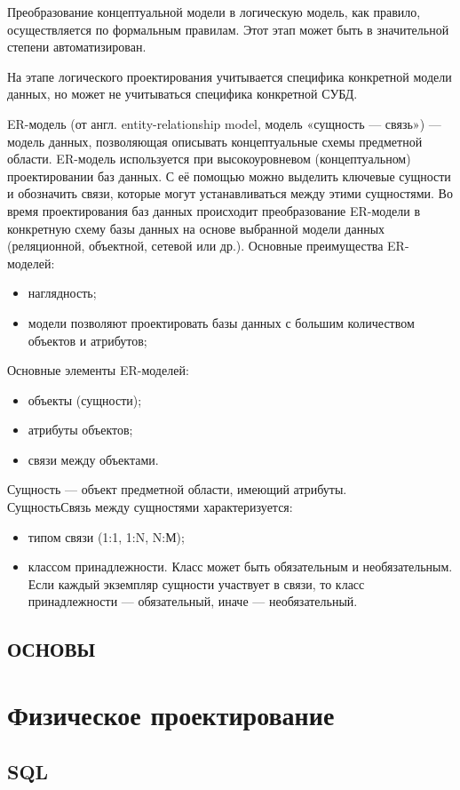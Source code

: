 \documentclass[14pt,a4paper,russian]{extreport}
\begin{document}
Преобразование концептуальной модели в логическую модель, как правило, осуществляется по
формальным правилам. Этот этап может быть в значительной степени автоматизирован.

На этапе логического проектирования учитывается специфика конкретной модели данных, но может
не учитываться специфика конкретной СУБД. 

ER-модель (от англ. entity-relationship model, модель «сущность — связь») — модель данных,
позволяющая описывать концептуальные схемы предметной области.  ER-модель используется при
высокоуровневом (концептуальном) проектировании баз данных. С её помощью можно выделить ключевые
сущности и обозначить связи, которые могут устанавливаться между этими сущностями.  Во время
проектирования баз данных происходит преобразование ER-модели в конкретную схему базы
данных на основе выбранной модели данных (реляционной, объектной, сетевой или др.).\cite{dbdesign}
\newpage
\noindent Основные преимущества ER-моделей:
\begin{itemize}[noitemsep]
    \item наглядность; 
    \item модели позволяют проектировать базы данных с большим количеством объектов и
        атрибутов;
\end{itemize}

\noindent Основные элементы ER-моделей:
\begin{itemize}[noitemsep]
    \item объекты (сущности);
    \item атрибуты объектов;
    \item связи между объектами.
\end{itemize}
\noindent Сущность — объект предметной области, имеющий атрибуты.\\
\noindent СущностьСвязь между сущностями характеризуется:
\begin{itemize}[noitemsep]
    \item типом связи (1:1, 1:N, N:М); 
    \item классом принадлежности. Класс может быть
        обязательным и необязательным. Если каждый экземпляр сущности участвует
        в связи, то класс принадлежности — обязательный, иначе — необязательный.
\end{itemize}


\section{ОСНОВЫ}



\chapter{Физическое проектирование}

\section{SQL}



{}
\end{document}
